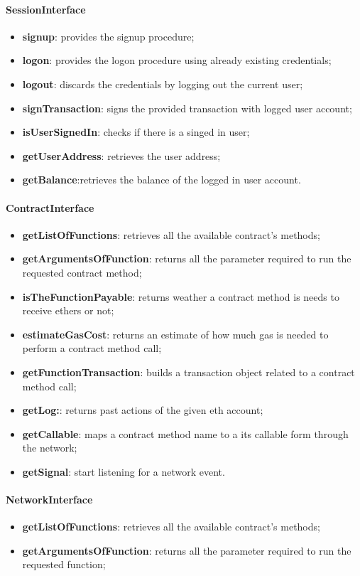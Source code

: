 \paragraph{SessionInterface}
\begin{itemize}
    \item \textbf{signup}: provides the signup procedure;
    \item \textbf{logon}: provides the logon procedure using already existing credentials;
    \item \textbf{logout}: discards the credentials by logging out the current user;
    \item \textbf{signTransaction}: signs the provided transaction with logged user account;
    \item \textbf{isUserSignedIn}: checks if there is a singed in user;
    \item \textbf{getUserAddress}: retrieves the user address;
    \item \textbf{getBalance}:retrieves the balance of the logged in user account.
\end{itemize}
\paragraph{ContractInterface}
\begin{itemize}
    \item \textbf{getListOfFunctions}: retrieves all the available contract's methods;
    \item \textbf{getArgumentsOfFunction}: returns all the parameter required to run the requested contract method;
    \item \textbf{isTheFunctionPayable}: returns weather a contract method is needs to receive ethers or not;
    \item \textbf{estimateGasCost}: returns an estimate of how much gas is needed to perform a contract method call;
    \item \textbf{getFunctionTransaction}: builds a transaction object related to a contract method call;
    \item \textbf{getLog:}: returns past actions of the given eth account; 
    \item \textbf{getCallable}: maps a contract method name to a its callable form through the network;
    \item \textbf{getSignal}: start listening for a network event.
\end{itemize}
\paragraph{NetworkInterface}
\begin{itemize}
    \item \textbf{getListOfFunctions}: retrieves all the available contract's methods;
    \item \textbf{getArgumentsOfFunction}: returns all the parameter required to run the requested function;
\end{itemize}
